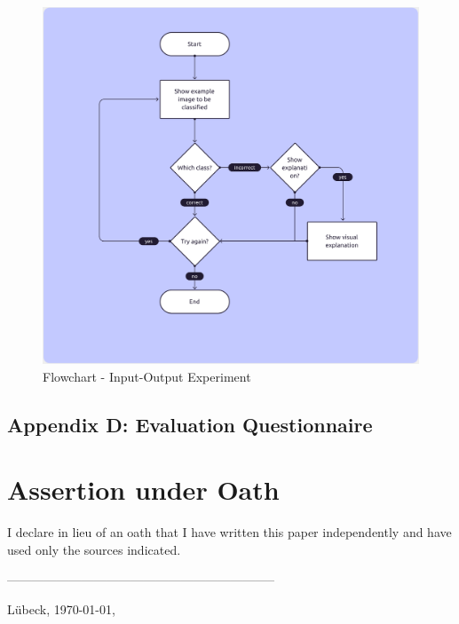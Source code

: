 \begin{figure}[htbp]
    \centering
    \includegraphics[width=\textwidth]{img/figures/flowcharts/experiment.png}
    \caption{Flowchart - Input-Output Experiment}
    \label{figure:flowchart_experiment}
\end{figure}
\clearpage

{}
\section*{Appendix D: Evaluation Questionnaire}\label{appendix:evaluation_questionnaire}

\clearpage

{}
\chapter*{Assertion under Oath}
I declare in lieu of an oath that I have written this paper independently and have used only the sources indicated.

-----------------------------------------------------------------

Lübeck, \today, \authorMA